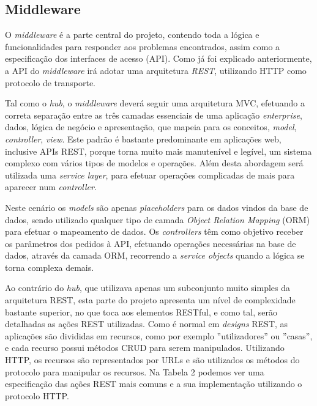 \subsection{Middleware}

O \textit{middleware} é a parte central do projeto, contendo toda a lógica e funcionalidades para responder aos problemas encontrados, assim como a especificação dos interfaces de acesso (API). Como já foi explicado anteriormente, a API do \textit{middleware} irá adotar uma arquitetura \textit{REST}, utilizando HTTP como protocolo de transporte.

Tal como o \textit{hub}, o \textit{middleware} deverá seguir uma arquitetura MVC, efetuando a correta separação entre as três camadas essenciais de uma aplicação \textit{enterprise}, dados, lógica de negócio e apresentação, que mapeia para os conceitos, \textit{model}, \textit{controller}, \textit{view}. Este padrão é bastante predominante em aplicações web, inclusive APIs REST, porque torna muito mais manutenível e legível, um sistema complexo com vários tipos de modelos e operações. Além desta abordagem será utilizada uma \textit{service layer}, para efetuar operações complicadas de mais para aparecer num \textit{controller}.

Neste cenário os \textit{models} são apenas \textit{placeholders} para os dados vindos da base de dados, sendo utilizado qualquer tipo de camada \textit{Object Relation Mapping} (ORM) para efetuar o mapeamento de dados. Os \textit{controllers} têm como objetivo receber os parâmetros dos pedidos à API, efetuando operações necessárias na base de dados, através da camada ORM, recorrendo a \textit{service objects} quando a lógica se torna complexa demais.

Ao contrário do \textit{hub}, que utilizava apenas um subconjunto muito simples da arquitetura REST, esta parte do projeto apresenta um nível de complexidade bastante superior, no que toca aos elementos RESTful, e como tal, serão detalhadas as ações REST utilizadas.
Como é normal em \textit{designs} REST, as aplicações são divididas em recursos, como por exemplo ''utilizadores'' ou ''casas'', e cada recurso possui métodos CRUD para serem manipulados. Utilizando HTTP, os recursos são representados por URLs e são utilizados os métodos do protocolo para manipular os recursos. Na Tabela 2 podemos ver uma especificação das ações REST mais comuns e a sua implementação utilizando o protocolo HTTP.


